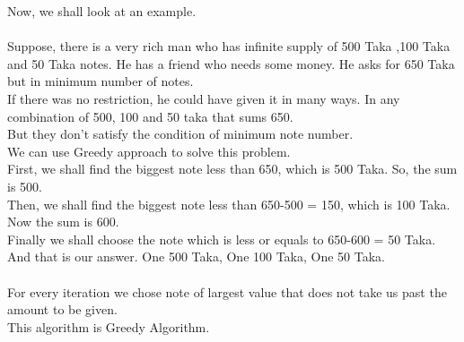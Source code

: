Now, we shall look at an example.\\ \\ 
Suppose, there is a very rich man who has infinite supply of 500 Taka ,100 Taka  and 50 Taka notes. He has a friend who needs some money. He asks for 650 Taka but in minimum number of notes.\\
If there was no restriction, he could have given it in many ways.
In any combination of 500, 100 and 50 taka that sums 650. \\
But they don't satisfy the condition of minimum note number.\\

We can use Greedy approach to solve this problem.\\
First, we shall find the biggest note less than 650, which is 500 Taka. So, the sum is 500.\\
Then, we shall find the biggest note less than 650-500 = 150, which is 100 Taka. Now the sum is 600.\\
Finally we shall choose the note which is less or equals to 650-600 = 50 Taka.\\
And that is our answer. One 500 Taka, One 100 Taka, One 50 Taka.\\
\\
For every iteration we chose note of largest value that does not take us past the amount to be given. \\
This algorithm is Greedy Algorithm.\\